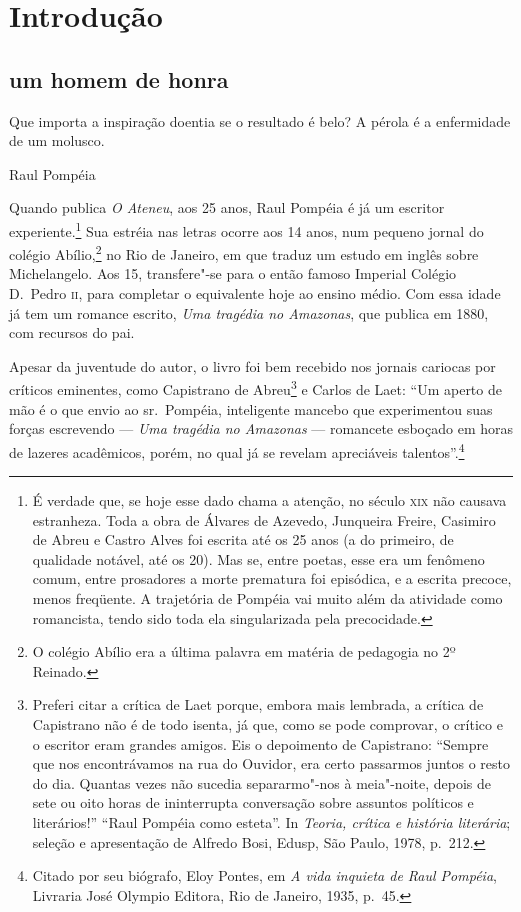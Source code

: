 \chapter[Introdução, \emph{por Caio Gagliardi}]{Introdução}

\section*{um homem de honra}

\epigraph{Que importa a inspiração doentia se o resultado é belo? A pérola é a enfermidade de um molusco.}{Raul Pompéia}

Quando publica \textit{O
Ateneu}, aos 25 anos, Raul Pompéia é já um escritor
experiente.\footnote{ É verdade que, se hoje esse dado chama a
atenção, no século \textsc{xix} não causava estranheza. Toda a obra de Álvares
de Azevedo, Junqueira Freire, Casimiro de Abreu e Castro Alves foi
escrita até os 25 anos (a do primeiro, de qualidade notável, até os
20). Mas se, entre poetas, esse era um fenômeno comum, entre prosadores
a morte prematura foi episódica, e a escrita precoce, menos freqüente.
A trajetória de Pompéia vai muito além da atividade como romancista,
tendo sido toda ela singularizada pela precocidade.}
Sua estréia nas letras ocorre aos 14 anos, num pequeno jornal do
colégio Abílio,\footnote{O colégio Abílio era a
última palavra em matéria de pedagogia no 2º Reinado.} no Rio de Janeiro, 
em que traduz um estudo em inglês sobre
Michelangelo. Aos 15, transfere"-se para o então famoso Imperial
Colégio D.~Pedro \textsc{ii}, para completar o equivalente hoje ao ensino médio.
Com essa idade já tem um romance escrito, \textit{Uma
tragédia no Amazonas}, que publica em 1880, com recursos do pai.


Apesar da juventude do autor, o livro foi bem recebido
nos jornais cariocas por críticos eminentes, como Capistrano de
Abreu\footnote{ Preferi citar a crítica de Laet porque, embora mais
lembrada, a crítica de Capistrano não é de todo isenta, já que, como se
pode comprovar, o crítico e o escritor eram grandes amigos. Eis o
depoimento de Capistrano: ``Sempre que nos encontrávamos na rua do
Ouvidor, era certo passarmos juntos o resto do dia. Quantas vezes não
sucedia separarmo"-nos à meia"-noite, depois de sete ou oito horas de
ininterrupta conversação sobre assuntos políticos e literários!'' ``Raul
Pompéia como esteta''. In \textit{Teoria, crítica e história literária};
seleção e apresentação de Alfredo Bosi, Edusp, São Paulo, 1978, p.~212.}
e Carlos de Laet: ``Um aperto de mão é o que envio ao
sr.~Pompéia, inteligente mancebo que experimentou suas forças
escrevendo --- \textit{Uma tragédia no
Amazonas} --- romancete esboçado em horas de lazeres
acadêmicos, porém, no qual já se revelam apreciáveis
talentos''.\footnote{ Citado por seu biógrafo, Eloy Pontes, em
\textit{A vida inquieta de Raul Pompéia}, Livraria José
Olympio Editora, Rio de Janeiro, 1935, p.~45.}

